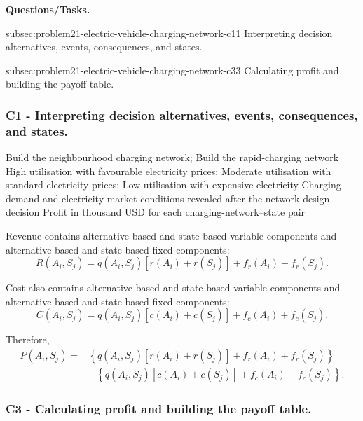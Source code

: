 \textbf{Questions/Tasks.}
\begin{enumerate}
	\CriterionTask
	{subsec:problem21-electric-vehicle-charging-network-c1}{1}
	{Interpreting decision alternatives, events, consequences, and states.}

	\CriterionTask
	{subsec:problem21-electric-vehicle-charging-network-c3}{3}
	{Calculating profit and building the payoff table.}
\end{enumerate}

\subsubsection*{C1 - Interpreting decision alternatives, events, consequences, and states.}
\label{subsec:problem21-electric-vehicle-charging-network-c1}

\DecisionElementsTable
{Build the neighbourhood charging network; Build the rapid-charging network}
{High utilisation with favourable electricity prices; Moderate utilisation with standard electricity prices; Low utilisation with expensive electricity}
{Charging demand and electricity-market conditions revealed after the network-design decision}
{Profit in thousand USD for each charging-network--state pair}

Revenue contains alternative-based and state-based variable components and
alternative-based and state-based fixed components:
\[
R(A_i,S_j)
=
q(A_i,S_j)
\left[
r(A_i)+r(S_j)
\right]
+
f_r(A_i)
+
f_r(S_j).
\]

Cost also contains alternative-based and state-based variable components and
alternative-based and state-based fixed components:
\[
C(A_i,S_j)
=
q(A_i,S_j)
\left[
c(A_i)+c(S_j)
\right]
+
f_c(A_i)
+
f_c(S_j).
\]

Therefore,
\[
\begin{aligned}
	P(A_i,S_j)
	={}&
	\left\{
	q(A_i,S_j)
	\left[
	r(A_i)+r(S_j)
	\right]
	+
	f_r(A_i)
	+
	f_r(S_j)
	\right\}
	\\
	&-
	\left\{
	q(A_i,S_j)
	\left[
	c(A_i)+c(S_j)
	\right]
	+
	f_c(A_i)
	+
	f_c(S_j)
	\right\}.
\end{aligned}
\]


\subsubsection*{C3 - Calculating profit and building the payoff table.}
\label{subsec:problem21-electric-vehicle-charging-network-c3}

